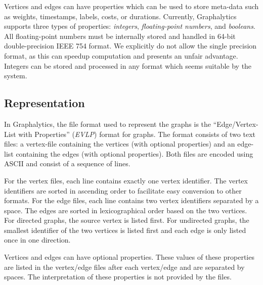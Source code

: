 Vertices and edges can have properties which can be used to store meta-data such as weights, timestamps, labels, costs, or durations. Currently, Graphalytics supports three types of properties: \emph{integers}, \emph{floating-point numbers}, and \emph{booleans}. All floating-point numbers must be internally stored and handled in 64-bit double-precision IEEE 754 format. We explicitly do not allow the single precision format, as this can speedup computation and presents an unfair advantage. Integers can be stored and processed in any format which seems suitable by the system.


\subsection{Representation}\label{sec:data:representation}
In Graphalytics, the file format used to represent the graphs is the ``Edge/Vertex-List with Properties'' (\emph{EVLP}) format for graphs. The format consists of two text files: a vertex-file containing the vertices (with optional properties) and an edge-list containing the edges (with optional properties). Both files are encoded using ASCII and consist of a sequence of lines.

For the vertex files, each line contains exactly one vertex identifier. The vertex identifiers are sorted in ascending order to facilitate easy conversion to other formats. For the edge files, each line contains two vertex identifiers separated by a space. The edges are sorted in lexicographical order based on the two vertices. For directed graphs, the source vertex is listed first. For undirected graphs, the smallest identifier of the two vertices is listed first and each edge is only listed once in one direction.

Vertices and edges can have optional properties. These values of these properties are listed in the vertex/edge files after each vertex/edge and are separated by spaces. The interpretation of these properties is not provided by the files.

